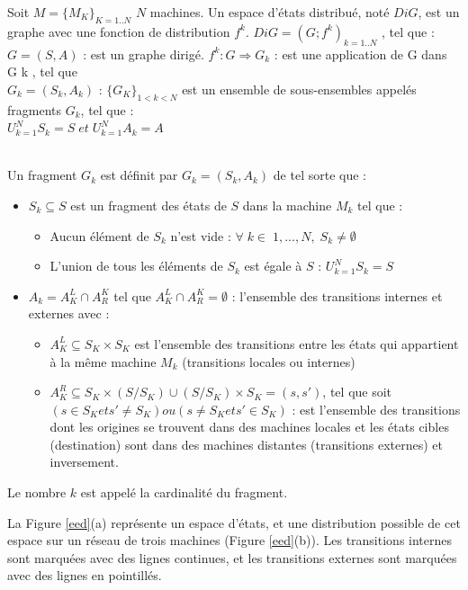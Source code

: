 \begin{definition}
Soit $M =\{M_K\}_{K=1..N}$ $N$ machines. Un espace d'états distribué, noté $DiG$, est un graphe avec une fonction de distribution $f^k$. $DiG = (G; f^k )_{ k=1..N}$ , tel que : $G = (S, A)$ : est un graphe dirigé.
$f^k : G \Rightarrow G_k$ : est une application de G dans G k , tel que \\$G_k = (S_k , A_k )$ : $\{G_K \}_{1<k<N}$ est un ensemble de sous-ensembles appelés fragments $G_k $, tel que :\\ $U^{N}_{k=1} S_k = S\; et\; U^{N}_{k=1}A_k = A$
\end{definition}

\begin{definition} \citep{BENSETIRA2017}\\
Un fragment $G_k$ est définit par $G_k = (S_k , A_k )$ de tel sorte que :
\begin{itemize}
\item $S_k\subseteq S$ est un fragment des états de $S$ dans la machine $M_k$ tel que :
	\begin{itemize}
	\item  Aucun élément de $S_k$ n'est vide : $\forall \;k \in \;1, ..., N,\; S_k \ne \emptyset$
	\item L'union de tous les éléments de $S_k$ est égale à $S$ : $U^{N}_ {k=1} S_k = S$
	\end{itemize}
\item $A_k = A^{L}_{K}\cap A^{K}_{R}$ tel que  $A^{L}_{K} \cap A^{K}_{R}= \emptyset$ : l'ensemble des transitions internes et externes avec :
	\begin{itemize}
	\item  $A^{L}_{K}\subseteq S_K \times S_K$ est l'ensemble des transitions entre les états qui appartient à la même machine $M_k$ (transitions locales ou internes)
	\item  $A^{R}_{K}\subseteq S_K \times (S/S_K ) \cup (S/S_K ) \times S_K = (s, s')$, tel que soit $(s \in S_K et s' \neq S_K ) ou(s \neq S_K et s'
\in S_K )$ : est l'ensemble des transitions dont les origines se trouvent dans des machines locales et les états cibles (destination) sont dans des machines distantes (transitions externes) et inversement.
	\end{itemize}
	
\end{itemize}
Le nombre $k$ est appelé la cardinalité du fragment.
\end{definition}

La Figure \ref{eed}(a) représente un espace d'états, et une distribution possible de cet espace sur un réseau de trois machines (Figure \ref{eed}(b)). Les transitions internes sont marquées avec des lignes continues, et les transitions externes sont marquées avec des lignes en pointillés.


